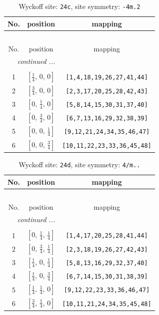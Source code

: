 \documentclass[fleqn,8pt]{jsarticle}
\begin{document}
\renewcommand{\arraystretch}{1.2}
\begin{longtable}{ccc}
\caption{Wyckoff site: {\tt 24c}, site symmetry: {\tt -4m.2}}
 \\
 \hline \hline
No. & position & mapping \\ \hline \endfirsthead

\multicolumn{2}{l}{\tablename\ \thetable{}} \\
 \hline \hline
No. & position & mapping \\ \hline \endhead

 \hline \hline
\multicolumn{2}{r}{\footnotesize\it continued ...} \\ \endfoot

 \hline \hline
\multicolumn{2}{r}{} \\ \endlastfoot

1 & $\left[ \frac{1}{4},\, 0,\, 0 \right]$ & {\tt [1,4,18,19,26,27,41,44]} \\ \hline
2 & $\left[ \frac{3}{4},\, 0,\, 0 \right]$ & {\tt [2,3,17,20,25,28,42,43]} \\ \hline
3 & $\left[ 0,\, \frac{1}{4},\, 0 \right]$ & {\tt [5,8,14,15,30,31,37,40]} \\ \hline
4 & $\left[ 0,\, \frac{3}{4},\, 0 \right]$ & {\tt [6,7,13,16,29,32,38,39]} \\ \hline
5 & $\left[ 0,\, 0,\, \frac{1}{4} \right]$ & {\tt [9,12,21,24,34,35,46,47]} \\ \hline
6 & $\left[ 0,\, 0,\, \frac{3}{4} \right]$ & {\tt [10,11,22,23,33,36,45,48]} \\
\end{longtable}
\renewcommand{\arraystretch}{1.2}
\begin{longtable}{ccc}
\caption{Wyckoff site: {\tt 24d}, site symmetry: {\tt 4/m..}}
 \\
 \hline \hline
No. & position & mapping \\ \hline \endfirsthead

\multicolumn{2}{l}{\tablename\ \thetable{}} \\
 \hline \hline
No. & position & mapping \\ \hline \endhead

 \hline \hline
\multicolumn{2}{r}{\footnotesize\it continued ...} \\ \endfoot

 \hline \hline
\multicolumn{2}{r}{} \\ \endlastfoot

1 & $\left[ 0,\, \frac{1}{4},\, \frac{1}{4} \right]$ & {\tt [1,4,17,20,25,28,41,44]} \\ \hline
2 & $\left[ 0,\, \frac{3}{4},\, \frac{1}{4} \right]$ & {\tt [2,3,18,19,26,27,42,43]} \\ \hline
3 & $\left[ \frac{1}{4},\, 0,\, \frac{1}{4} \right]$ & {\tt [5,8,13,16,29,32,37,40]} \\ \hline
4 & $\left[ \frac{1}{4},\, 0,\, \frac{3}{4} \right]$ & {\tt [6,7,14,15,30,31,38,39]} \\ \hline
5 & $\left[ \frac{1}{4},\, \frac{1}{4},\, 0 \right]$ & {\tt [9,12,22,23,33,36,46,47]} \\ \hline
6 & $\left[ \frac{3}{4},\, \frac{1}{4},\, 0 \right]$ & {\tt [10,11,21,24,34,35,45,48]} \\
\end{longtable}
\end{document}

